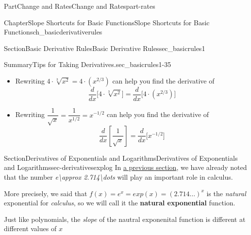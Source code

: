 \documentclass[oneside,10pt,]{tufte-book}
\newcommand{\terminology}[1]{\textbf{#1}}
\numberwithin{equation}{chapter}
\newcommand{\ddx}[1]{ \dfrac{d}{dx} \Big[ #1 \Big]  }
\newcommand{\ddxfrac}[1]{ \dfrac{d}{dx} \left[ #1 \right]  }
\begin{document}
\begin{partptx}{Part}{Change and Rates}{}{Change and Rates}{}{}{part-rates}
\begin{chapterptx}{Chapter}{Slope Shortcuts for Basic Functions}{}{Slope Shortcuts for Basic Functions}{}{}{ch_basicderivativerules}
\begin{sectionptx}{Section}{Basic Derivative Rules}{}{Basic Derivative Rules}{}{}{sec_basicrules1}
\begin{assemblage}{Summary}{Tips for Taking Derivatives.}{sec_basicrules1-35}
\begin{enumerate}
\begin{itemize}[label=\textbullet]
%
\item{}Rewriting \(4\cdot \sqrt[3]{x^2} = 4\cdot (x^{2/3}) \) can help you find the derivative of%
\begin{equation*}
\ddx{4\cdot \sqrt[3]{x^2}} = \ddx{4\cdot (x^{2/3})} 
\end{equation*}
%
\item{}Rewriting \(\dfrac{1}{\sqrt{x}} = \dfrac{1}{x^{1/2}}= x^{-1/2}\) can help you find the derivative of%
\begin{equation*}
\ddxfrac{\dfrac{1}{\sqrt{x}} } = \ddx{x^{-1/2} } 
\end{equation*}
%
\end{itemize}
\end{enumerate}
%
\end{assemblage}
\end{sectionptx}
%
%
\typeout{************************************************}
\typeout{************************************************}
%
\begin{sectionptx}{Section}{Derivatives of Exponentials and Logarithms}{}{Derivatives of Exponentials and Logarithms}{}{}{sec-derivativesexplog}
In \hyperlink{subsec-naturalexp}{a previous section}, we have already noted that the number \emph{e\textbackslash{}approx 2.714\textbackslash{}dots} will play an important role in calculus.%
\par
More precisely, we said that \(f(x) = e^x = exp(x) = (2.714\dots)^x \) is the \emph{natural} exponential for \emph{calculus}, so we will call it the \terminology{natural exponential} function.%
\par
Just like polynomials, the \emph{slope} of the nautral exponenital function is different at different values of \(x\) \begin{sidebyside}{2}{0.075}{0.075}{0.17}%
\begin{sbspanel}{0.47}%

\end{sbspanel}
\end{sidebyside}
\end{sectionptx}
\end{chapterptx}
\end{partptx}
\end{document}
